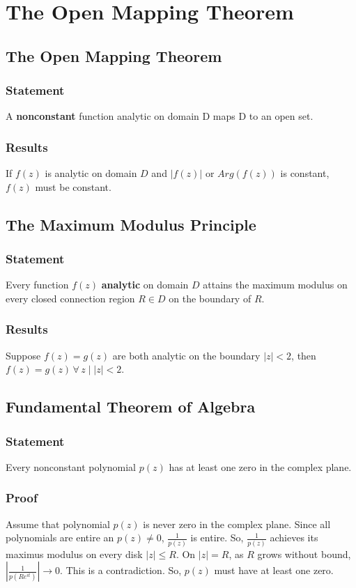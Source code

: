 \documentclass[../main.tex]{subfiles}
\begin{document}
\chapter{The Open Mapping Theorem}
\section{The Open Mapping Theorem}
    \subsection{Statement}
        A \textbf{nonconstant} function analytic on domain D maps D to an open set.
    
    \subsection{Results}
        If $f(z)$ is analytic on domain $D$ and $|f(z)|$ or $Arg(f(z))$ is constant,
        $f(z)$ must be constant.

\section{The Maximum Modulus Principle}
    \subsection{Statement}
    Every function $f(z)$ \textbf{analytic} on domain $D$ attains the maximum modulus
    on every closed connection region $R \in D$ on the boundary of $R$.

    \subsection{Results}
        Suppose $f(z)=g(z)$ are both analytic on the boundary $|z|<2$, then $f(z)=g(z)\,\forall\, z\mid |z|<2$.

\section{Fundamental Theorem of Algebra}
    \subsection{Statement}
    Every nonconstant polynomial $p(z)$ has at least one zero in the complex plane.
    
    \subsection{Proof}
        Assume that polynomial $p(z)$ is never zero in the complex plane. 
        Since all polynomials are entire an $p(z)\neq 0$, $\frac{1}{p(z)}$ is entire.
        So, $\frac{1}{p(z)}$ achieves its maximus modulus on every disk $|z|\leq R$. On $|z|=R$,
        as $R$ grows without bound, $|\frac{1}{p(Re^{it})}|\rightarrow 0$. 
        This is a contradiction. So, $p(z)$ must have at least one zero.
\end{document}
